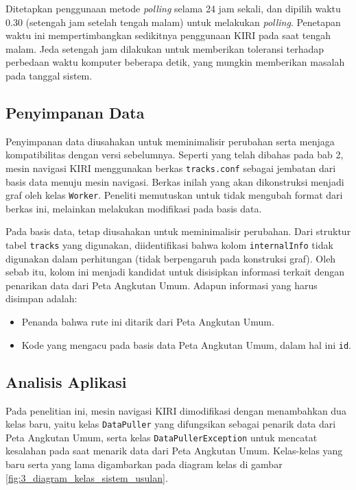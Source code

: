 Ditetapkan penggunaan metode \textit{polling} selama 24 jam sekali, dan dipilih waktu 0.30 (setengah jam setelah tengah malam) untuk melakukan \textit{polling}. Penetapan waktu ini mempertimbangkan sedikitnya penggunaan KIRI pada saat tengah malam. Jeda setengah jam dilakukan untuk memberikan toleransi terhadap perbedaan waktu komputer beberapa detik, yang mungkin memberikan masalah pada tanggal sistem. 

\subsection{Penyimpanan Data}

Penyimpanan data diusahakan untuk meminimalisir perubahan serta menjaga kompatibilitas dengan versi sebelumnya. Seperti yang telah dibahas pada bab 2, mesin navigasi KIRI menggunakan berkas \texttt{tracks.conf} sebagai jembatan dari basis data menuju mesin navigasi. Berkas inilah yang akan dikonstruksi menjadi graf oleh kelas \texttt{Worker}. Peneliti memutuskan untuk tidak mengubah format dari berkas ini, melainkan melakukan modifikasi pada basis data.

Pada basis data, tetap diusahakan untuk meminimalisir perubahan. Dari struktur tabel \texttt{tracks} yang digunakan, diidentifikasi bahwa kolom \texttt{internalInfo} tidak digunakan dalam perhitungan (tidak berpengaruh pada konstruksi graf). Oleh sebab itu, kolom ini menjadi kandidat untuk disisipkan informasi terkait dengan penarikan data dari Peta Angkutan Umum. Adapun informasi yang harus disimpan adalah:

\begin{itemize}
	\item Penanda bahwa rute ini ditarik dari Peta Angkutan Umum.
	\item Kode yang mengacu pada basis data Peta Angkutan Umum, dalam hal ini \texttt{id}.
\end{itemize}

\subsection{Analisis Aplikasi}

Pada penelitian ini, mesin navigasi KIRI dimodifikasi dengan menambahkan dua kelas baru, yaitu kelas \texttt{DataPuller} yang difungsikan sebagai penarik data dari Peta Angkutan Umum, serta kelas \texttt{DataPullerException} untuk mencatat kesalahan pada saat menarik data dari Peta Angkutan Umum. Kelas-kelas yang baru serta yang lama digambarkan pada diagram kelas di gambar \ref{fig:3_diagram_kelas_sistem_usulan}.

